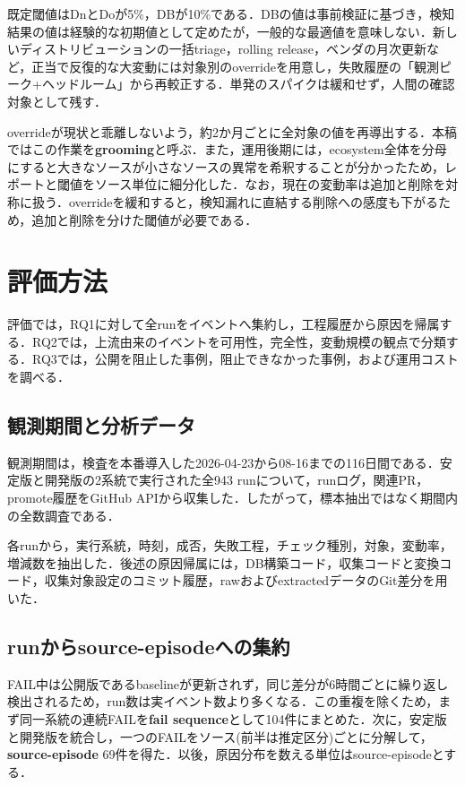 \documentclass{css}
\begin{document}
既定閾値はDnとDoが5\%，DBが10\%である．DBの値は事前検証に基づき，検知結果の値は経験的な初期値として定めたが，一般的な最適値を意味しない．新しいディストリビューションの一括triage，rolling release，ベンダの月次更新など，正当で反復的な大変動には対象別のoverrideを用意し，失敗履歴の「観測ピーク+ヘッドルーム」から再較正する．単発のスパイクは緩和せず，人間の確認対象として残す．

overrideが現状と乖離しないよう，約2か月ごとに全対象の値を再導出する．本稿ではこの作業を\textbf{grooming}と呼ぶ．また，運用後期には，ecosystem全体を分母にすると大きなソースが小さなソースの異常を希釈することが分かったため，レポートと閾値をソース単位に細分化した．なお，現在の変動率は追加と削除を対称に扱う．overrideを緩和すると，検知漏れに直結する削除への感度も下がるため，追加と削除を分けた閾値が必要である．

\section{評価方法}
\label{sec:method}

評価では，RQ1に対して全runをイベントへ集約し，工程履歴から原因を帰属する．RQ2では，上流由来のイベントを可用性，完全性，変動規模の観点で分類する．RQ3では，公開を阻止した事例，阻止できなかった事例，および運用コストを調べる．

\subsection{観測期間と分析データ}

観測期間は，検査を本番導入した2026-04-23から08-16までの116日間である．安定版と開発版の2系統で実行された全943 runについて，runログ，関連PR，promote履歴をGitHub APIから収集した．したがって，標本抽出ではなく期間内の全数調査である．

各runから，実行系統，時刻，成否，失敗工程，チェック種別，対象，変動率，増減数を抽出した．後述の原因帰属には，DB構築コード，収集コードと変換コード，収集対象設定のコミット履歴，rawおよびextractedデータのGit差分を用いた．

\subsection{runからsource-episodeへの集約}

FAIL中は公開版であるbaselineが更新されず，同じ差分が6時間ごとに繰り返し検出されるため，run数は実イベント数より多くなる．この重複を除くため，まず同一系統の連続FAILを\textbf{fail sequence}として104件にまとめた．次に，安定版と開発版を統合し，一つのFAILをソース(前半は推定区分)ごとに分解して，\textbf{source-episode} 69件を得た．以後，原因分布を数える単位はsource-episodeとする．
\end{document}
